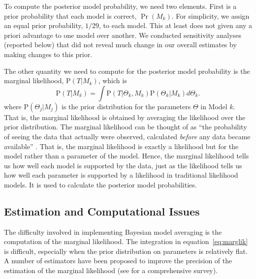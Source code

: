 \documentclass[11pt,titlepage]{article}
\renewcommand{\P}{\text{P}}
\begin{document}
To compute the posterior model probability, we need two elements.
First is a prior probability that each model is correct, $\Pr(M_k)$.
For simplicity, we assign an equal prior probability, $1/29$, to each
model.  This at least does not given any a priori advantage to one
model over another.  We conducted sensitivity analyses (reported
below) that did not reveal much change in our overall estimates by
making changes to this prior.

The other quantity we need to compute for the posterior model
probability is the marginal likelihood, $\P(T|M_k)$, which is
\begin{equation}
  \P(T|M_k) = \int \P(T|\Theta_k, M_k) \P(\Theta_k|M_k) d\Theta_k. 
  \label{eq:marglik}
\end{equation} 
where $\P(\Theta_j|M_j)$ is the prior distribution for the parameters
$\Theta$ in Model $k$. That is, the marginal likelihood is obtained by
averaging the likelihood over the prior distribution.  The marginal
likelihood can be thought of as ``the probability of seeing the data
that actually were observed, calculated \emph{before} any data became
available'' \cite[p.776]{kass:raft:95}.  That is, the marginal
likelihood is exactly a likelihood but for the model rather than a
parameter of the model.  Hence, the marginal likelihood tells us how
well each model is supported by the data, just as the likelihood tells
us how well each parameter is supported by a likelihood in traditional
likelihood models.  It is used to calculate the posterior model
probabilities.

\subsection{Estimation and Computational Issues}

The difficulty involved in implementing Bayesian model averaging is
the computation of the marginal likelihood. The integration in
equation~\ref{eq:marglik} is difficult, especially when the prior
distribution on parameters is relatively flat. A number of estimators
have been proposed to improve the precision of the estimation of the
marginal likelihood (see \citet{kass:raft:95} for a comprehensive
survey).
\end{document}

